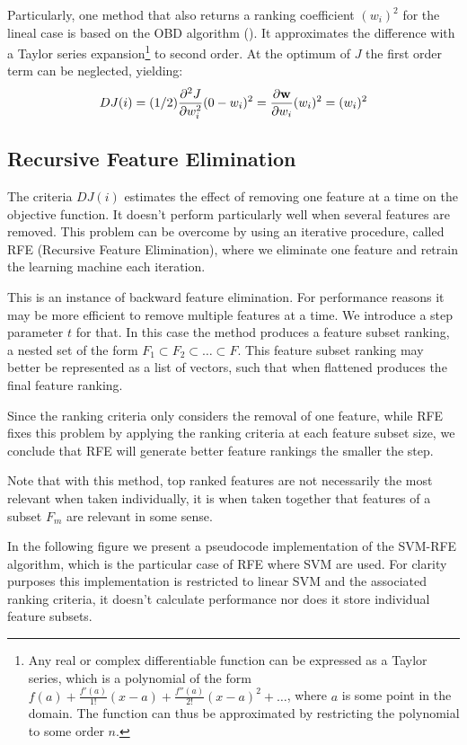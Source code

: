 Particularly, one method that also returns a ranking coefficient $(w_i)^2$ for the lineal case is based on the OBD algorithm (\cite{guyon_gene_2002}). It approximates the dif\-fer\-ence with a Taylor series expansion\footnote{Any real or complex differentiable function can be expressed as a Taylor series, which is a polynomial of the form $f(a) + \frac{f'(a)}{1!}(x - a) + \frac{f''(a)}{2!}(x - a)^2 + \dots$, where $a$ is some point in the domain. The function can thus be approximated by restricting the polynomial to some order $n$.} to second order. At the optimum of $J$ the first order term can be neglected, yielding:
\begin{align*}
    DJ(i) = (1/2) \frac{\partial^2 J}{\partial w_i^2} (0 - w_i)^2 = \frac{\partial \mathbf{w}}{\partial w_i} (w_i)^2 = (w_i)^2
\end{align*}

\subsection{Recursive Feature Elimination}

The criteria $DJ(i)$ estimates the effect of removing one feature at a time on the objective function. It doesn't perform particularly well when several features are removed. This problem can be overcome by using an iterative procedure, called RFE (Recursive Feature Elimination), where we eliminate one feature and retrain the learning machine each iteration.

This is an instance of backward feature elimination. For performance reasons it may be more efficient to remove multiple features at a time. We introduce a step parameter $t$ for that. In this case the method produces a feature subset ranking, a nested set of the form $F_1 \subset F_2 \subset \dots \subset F$. This feature subset ranking may better be represented as a list of vectors, such that when flat\-tened produces the final feature ranking.

Since the ranking criteria only considers the removal of one feature, while RFE fixes this problem by applying the ranking criteria at each feature subset size, we conclude that RFE will generate better feature rankings the smaller the step.

Note that with this method, top ranked features are not necessarily the most relevant when taken individually, it is when taken together that features of a subset $F_m$ are relevant in some sense.

In the following figure we present a pseudocode implementation of the SVM-RFE algorithm, which is the particular case of RFE where SVM are used. For clarity purposes this implementation is restricted to linear SVM and the associated ranking criteria, it doesn't calculate performance nor does it store individual feature subsets.

